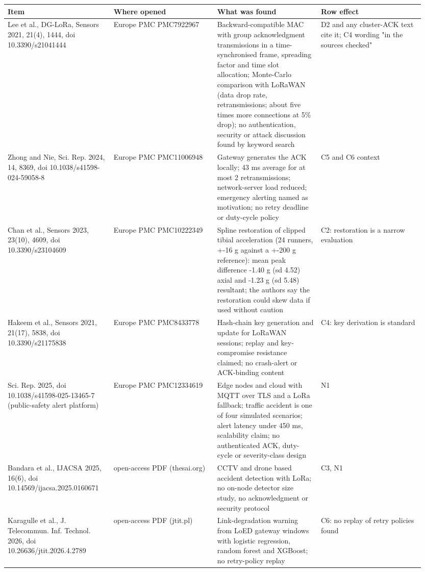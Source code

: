 {\scriptsize\raggedright
\begin{longtable}{p{0.237\linewidth}p{0.237\linewidth}p{0.237\linewidth}p{0.237\linewidth}}
\toprule
Item & Where opened & What was found & Row effect \\
\midrule
\endhead
Lee et al., DG-LoRa, Sensors 2021, 21(4), 1444, doi 10.3390/s21041444 & Europe PMC PMC7922967 & Backward-compatible MAC with group acknowledgment transmissions in a time-synchronised frame, spreading factor and time slot allocation; Monte-Carlo comparison with LoRaWAN (data drop rate, retransmissions; about five times more connections at 5\% drop); no authentication, security or attack discussion found by keyword search & D2 and any cluster-ACK text cite it; C4 wording "in the sources checked" \\
Zhong and Nie, Sci. Rep. 2024, 14, 8369, doi 10.1038/s41598-024-59058-8 & Europe PMC PMC11006948 & Gateway generates the ACK locally; 43 ms average for at most 2 retransmissions; network-server load reduced; emergency alerting named as motivation; no retry deadline or duty-cycle policy & C5 and C6 context \\
Chan et al., Sensors 2023, 23(10), 4609, doi 10.3390/s23104609 & Europe PMC PMC10222349 & Spline restoration of clipped tibial acceleration (24 runners, +-16 g against a +-200 g reference): mean peak difference -1.40 g (sd 4.52) axial and -1.23 g (sd 5.48) resultant; the authors say the restoration could skew data if used without caution & C2: restoration is a narrow evaluation \\
Hakeem et al., Sensors 2021, 21(17), 5838, doi 10.3390/s21175838 & Europe PMC PMC8433778 & Hash-chain key generation and update for LoRaWAN sessions; replay and key-compromise resistance claimed; no crash-alert or ACK-binding content & C4: key derivation is standard \\
Sci. Rep. 2025, doi 10.1038/s41598-025-13465-7 (public-safety alert platform) & Europe PMC PMC12334619 & Edge nodes and cloud with MQTT over TLS and a LoRa fallback; traffic accident is one of four simulated scenarios; alert latency under 450 ms, scalability claim; no authenticated ACK, duty-cycle or severity-class design & N1 \\
Bandara et al., IJACSA 2025, 16(6), doi 10.14569/ijacsa.2025.0160671 & open-access PDF (thesai.org) & CCTV and drone based accident detection with LoRa; no on-node detector size study, no acknowledgment or security protocol & C3, N1 \\
Karagulle et al., J. Telecommun. Inf. Technol. 2026, doi 10.26636/jtit.2026.4.2789 & open-access PDF (jtit.pl) & Link-degradation warning from LoED gateway windows with logistic regression, random forest and XGBoost; no retry-policy replay & C6: no replay of retry policies found \\
\bottomrule
\end{longtable}}

